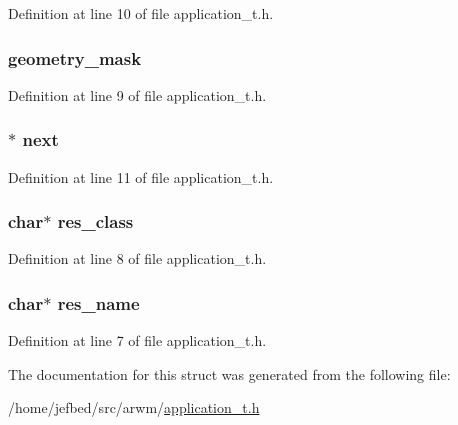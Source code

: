 Definition at line 10 of file application\_\-t.h.

\hypertarget{struct_application_a0fe1a44b75e085ca96a18d3e7686c474}{
\subsubsection[{geometry\_\-mask}]{ {\bf geometry\_\-mask}}}
\label{struct_application_a0fe1a44b75e085ca96a18d3e7686c474}


Definition at line 9 of file application\_\-t.h.

\hypertarget{struct_application_ab92200140565fb0b0819cf8388c58356}{
\subsubsection[{next}]{$\ast$ {\bf next}}}
\label{struct_application_ab92200140565fb0b0819cf8388c58356}


Definition at line 11 of file application\_\-t.h.

\hypertarget{struct_application_a0aeb2856c5f54c1744e73632e7c595b7}{
\subsubsection[{res\_\-class}]{\setlength{\rightskip}{0pt plus 5cm}char$\ast$ {\bf res\_\-class}}}
\label{struct_application_a0aeb2856c5f54c1744e73632e7c595b7}


Definition at line 8 of file application\_\-t.h.

\hypertarget{struct_application_ae178e0b707bb083445446bacf79138f0}{
\subsubsection[{res\_\-name}]{\setlength{\rightskip}{0pt plus 5cm}char$\ast$ {\bf res\_\-name}}}
\label{struct_application_ae178e0b707bb083445446bacf79138f0}


Definition at line 7 of file application\_\-t.h.



The documentation for this struct was generated from the following file:\begin{DoxyCompactItemize}
\item 
/home/jefbed/src/arwm/\hyperlink{application__t_8h}{application\_\-t.h}\end{DoxyCompactItemize}
